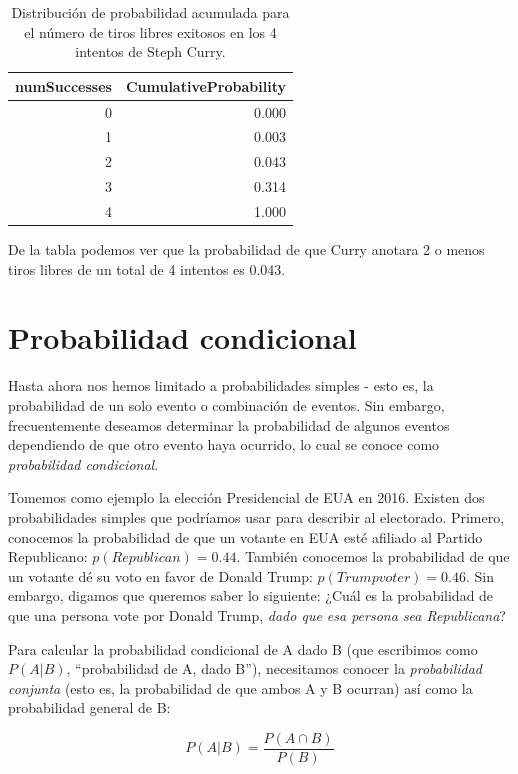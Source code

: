 \documentclass[
  12pt,
]{book}
\theoremstyle{definition}
\theoremstyle{definition}
\theoremstyle{definition}
\theoremstyle{remark}
\begin{document}
\begin{table}

\caption{\label{tab:CurryCumulativeProb}Distribución de probabilidad acumulada para el número de tiros libres exitosos en los 4 intentos de Steph Curry.}
\centering
\begin{tabular}[t]{r|r}
\hline
numSuccesses & CumulativeProbability\\
\hline
0 & 0.000\\
\hline
1 & 0.003\\
\hline
2 & 0.043\\
\hline
3 & 0.314\\
\hline
4 & 1.000\\
\hline
\end{tabular}
\end{table}

De la tabla podemos ver que la probabilidad de que Curry anotara 2 o menos tiros libres de un total de 4 intentos es 0.043.

\hypertarget{conditional-probability}{%
\section{Probabilidad condicional}\label{conditional-probability}}

Hasta ahora nos hemos limitado a probabilidades simples - esto es, la probabilidad de un solo evento o combinación de eventos. Sin embargo, frecuentemente deseamos determinar la probabilidad de algunos eventos dependiendo de que otro evento haya ocurrido, lo cual se conoce como \emph{probabilidad condicional}.

Tomemos como ejemplo la elección Presidencial de EUA en 2016. Existen dos probabilidades simples que podríamos usar para describir al electorado. Primero, conocemos la probabilidad de que un votante en EUA esté afiliado al Partido Republicano: \(p(Republican) = 0.44\). También conocemos la probabilidad de que un votante dé su voto en favor de Donald Trump: \(p(Trump voter)=0.46\). Sin embargo, digamos que queremos saber lo siguiente: ¿Cuál es la probabilidad de que una persona vote por Donald Trump, \emph{dado que esa persona sea Republicana}?

Para calcular la probabilidad condicional de A dado B (que escribimos como \(P(A|B)\), ``probabilidad de A, dado B''), necesitamos conocer la \emph{probabilidad conjunta} (esto es, la probabilidad de que ambos A y B ocurran) así como la probabilidad general de B:

\[
P(A|B) = \frac{P(A \cap B)}{P(B)}
\]
\end{document}
